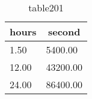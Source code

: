 \newcommand*{\thead}[1]{\multicolumn{1}{c}{\bfseries #1}}%
\newcommand*{\unitHead}[1]{\multicolumn{1}{c}{\si{#1}}}%

\begin{table}[h]%
\centering%
\begin{tabular}{ll}%
\toprule%
\thead{hours}&\thead{second}\\
\toprule%
1.50	&	5400.00 \\%
12.00	&	43200.00 \\%
24.00	&	86400.00 \\%
\bottomrule%
\end{tabular}%
\caption{table201}%
\label{tab:table201}%
\end{table}%
